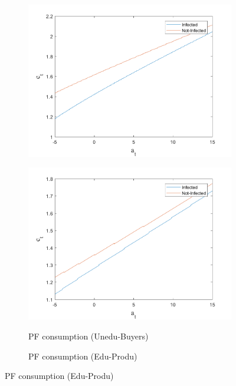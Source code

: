 \begin{figure}[H]
\begin{subfigure}{0.5\textwidth}
   \includegraphics[width=\linewidth,height = 0.22\textheight]{figures/matu/FIG6.png}
    \label{fig_dert}
\end{subfigure}
\hspace*{\fill}
\begin{subfigure}{0.5\textwidth}\caption{PF consumption (Unedu-Buyers)}
   \includegraphics[width=\linewidth,height = 0.22\textheight]{figures/matu/FIG5.png}
    \label{fig:x_b}
\end{subfigure}
\bigskip
\begin{subfigure}{0.5\textwidth}\caption{PF consumption (Edu-Produ)}

\end{subfigure}
\end{figure}
